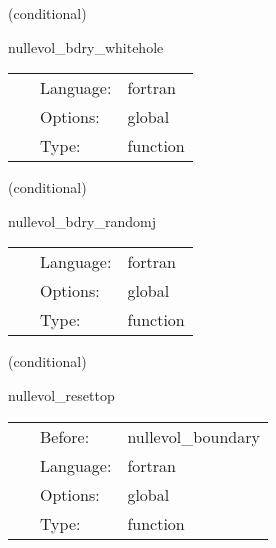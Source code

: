    (conditional) 

\hspace{5mm} nullevol\_bdry\_whitehole 

\hspace{5mm}{\it give white hole boundary conditions for the null metric } 


\hspace{5mm}

 \begin{tabular*}{160mm}{cll} 
~ & Language:  & fortran \\ 
~ & Options:  & global \\ 
~ & Type:  & function \\ 
\end{tabular*} 


\vspace{5mm}

   (conditional) 

\hspace{5mm} nullevol\_bdry\_randomj 

\hspace{5mm}{\it give random j boundary conditions for the null metric } 


\hspace{5mm}

 \begin{tabular*}{160mm}{cll} 
~ & Language:  & fortran \\ 
~ & Options:  & global \\ 
~ & Type:  & function \\ 
\end{tabular*} 


\vspace{5mm}

   (conditional) 

\hspace{5mm} nullevol\_resettop 

\hspace{5mm}{\it reset top values } 


\hspace{5mm}

 \begin{tabular*}{160mm}{cll} 
~ & Before:  & nullevol\_boundary \\ 
~ & Language:  & fortran \\ 
~ & Options:  & global \\ 
~ & Type:  & function \\ 
\end{tabular*} 



